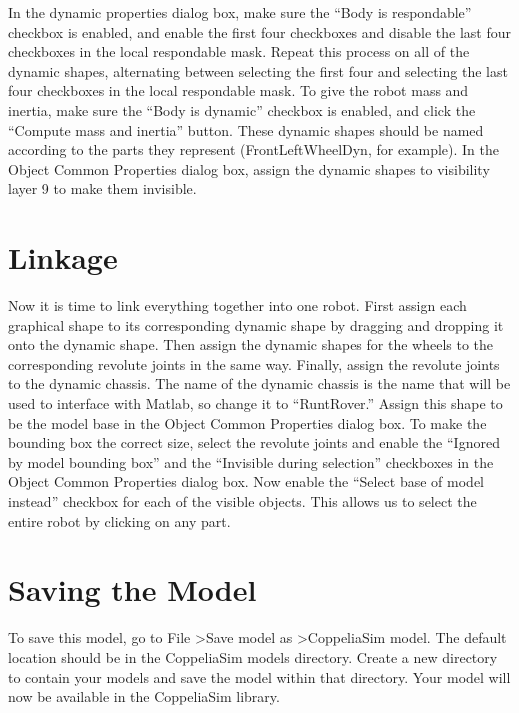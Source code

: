 In the dynamic properties dialog box, make sure the ``Body is respondable'' checkbox is enabled, and enable the first four checkboxes and disable the last four checkboxes in the local respondable mask. Repeat this process on all of the dynamic shapes, alternating between selecting the first four and selecting the last four checkboxes in the local respondable mask. To give the robot mass and inertia, make sure the ``Body is dynamic'' checkbox is enabled, and click the ``Compute mass and inertia'' button. These dynamic shapes should be named according to the parts they represent (FrontLeftWheelDyn, for example). In the Object Common Properties dialog box, assign the dynamic shapes to visibility layer 9 to make them invisible.

\section{Linkage}
Now it is time to link everything together into one robot. First assign each graphical shape to its corresponding dynamic shape by dragging and dropping it onto the dynamic shape. Then assign the dynamic shapes for the wheels to the corresponding revolute joints in the same way. Finally, assign the revolute joints to the dynamic chassis. The name of the dynamic chassis is the name that will be used to interface with Matlab, so change it to ``RuntRover.'' Assign this shape to be the model base in the Object Common Properties dialog box. To make the bounding box the correct size, select the revolute joints and enable the ``Ignored by model bounding box'' and the ``Invisible during selection'' checkboxes in the Object Common Properties dialog box. Now enable the ``Select base of model instead'' checkbox for each of the visible objects. This allows us to select the entire robot by clicking on any part.

\section{Saving the Model}
To save this model, go to File \textgreater Save model as \textgreater CoppeliaSim model. The default location should be in the CoppeliaSim models directory. Create a new directory to contain your models and save the model within that directory. Your model will now be available in the CoppeliaSim library.



